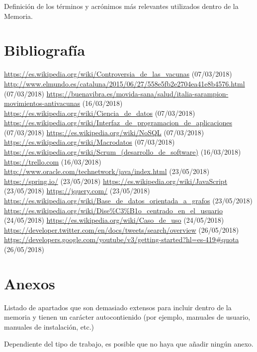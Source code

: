 \documentclass[11pt,a4paper]{article}
\begin{document}
Definición de los términos y acrónimos más relevantes utilizados dentro de la Memoria. 
\newpage 


\section{Bibliografía}
\bigskip

\begin{thebibliography}{0}
   \url{https://es.wikipedia.org/wiki/Controversia_de_las_vacunas} (07/03/2018)
   \url{http://www.elmundo.es/cataluna/2015/06/27/558e5fb2e2704ea41e8b4576.html} (07/03/2018)
   \url{https://buenavibra.es/movida-sana/salud/italia-sarampion-movimientos-antivacunas} (16/03/2018)
   \url{https://es.wikipedia.org/wiki/Ciencia_de_datos} (07/03/2018)
   \url{https://es.wikipedia.org/wiki/Interfaz_de_programacion_de_aplicaciones} (07/03/2018)
   \url{https://es.wikipedia.org/wiki/NoSQL} (07/03/2018)
   \url{https://es.wikipedia.org/wiki/Macrodatos} (07/03/2018)
   \url{https://es.wikipedia.org/wiki/Scrum_(desarrollo_de_software)} (16/03/2018)
   \url{https://trello.com} (16/03/2018)
   \url{http://www.oracle.com/technetwork/java/index.html} (23/05/2018)
   \url{https://spring.io/} (23/05/2018)
   \url{https://es.wikipedia.org/wiki/JavaScript} (23/05/2018)
   \url{https://jquery.com/} (23/05/2018)
   \url{https://es.wikipedia.org/wiki/Base_de_datos_orientada_a_grafos} (23/05/2018)
   \url{https://es.wikipedia.org/wiki/Dise%C3%B1o_centrado_en_el_usuario} (24/05/2018)
   \url{https://es.wikipedia.org/wiki/Caso_de_uso} (24/05/2018) 
   \url{https://developer.twitter.com/en/docs/tweets/search/overview} (26/05/2018) 
   \url{https://developers.google.com/youtube/v3/getting-started?hl=es-419#quota} (26/05/2018) 
\end{thebibliography}
\newpage 


\section{Anexos}
\bigskip

Listado de apartados que son demasiado extensos para incluir dentro de la memoria y tienen un carácter autocontienido (por ejemplo, manuales de usuario, manuales de instalación, etc.) 

Dependiente del tipo de trabajo, es posible que no haya que añadir ningún anexo.
\end{document}
